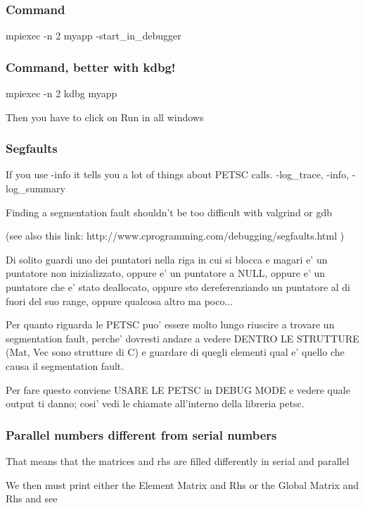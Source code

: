 \documentclass[10pt]{book}
\begin{document}
 \subsubsection{Command}

 mpiexec -n 2 myapp -start\_in\_debugger
 
 \subsubsection{Command, better with kdbg!}

 mpiexec -n 2 kdbg myapp
 
 Then you have to click on Run in all windows
 
 \subsubsection{Segfaults}

If you use -info it tells you a lot of things about PETSC calls.
-log\_trace, -info, -log\_summary

Finding a segmentation fault shouldn't be too difficult with valgrind or gdb

(see also this link:
http://www.cprogramming.com/debugging/segfaults.html )

Di solito guardi uno dei puntatori nella riga in cui si 
blocca e magari e' un puntatore non inizializzato,
oppure e' un puntatore a NULL, 
oppure e' un puntatore che e' stato deallocato,
oppure sto dereferenziando un puntatore al di fuori del suo range,
oppure qualcosa altro ma poco...

Per quanto riguarda le PETSC puo' essere molto lungo riuscire 
a trovare un segmentation fault, perche' dovresti 
andare a vedere DENTRO LE STRUTTURE (Mat, Vec sono strutture di C)
e guardare di quegli elementi qual e' quello 
che causa il segmentation fault.

Per fare questo conviene USARE LE PETSC in DEBUG MODE 
e vedere quale output ti danno;
cosi' vedi le chiamate all'interno della libreria petsc.


  \subsubsection{Parallel numbers different from serial numbers}
  
  
  That means that the matrices and rhs are filled differently in serial and parallel
  
  We then must print either the Element Matrix and Rhs or the Global Matrix and Rhs 
  and see
\end{document}
